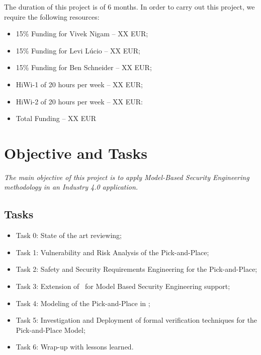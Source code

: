 The duration of this project is of 6 months. In order to carry out this project, we require the following resources:

\begin{itemize}
  \item 15\% Funding for Vivek Nigam -- XX EUR;
  \item 15\% Funding for Levi L\'ucio -- XX EUR;
  \item 15\% Funding for Ben Schneider -- XX EUR;
  \item HiWi-1 of 20 hours per week -- XX EUR;
  \item HiWi-2 of 20 hours per week -- XX EUR:
  \item Total Funding -- XX EUR
\end{itemize}

\section{Objective and Tasks}

\begin{center}
  \emph{The main objective of this project is to apply Model-Based Security Engineering methodology in an Industry 4.0 application.}
\end{center}

\subsection{Tasks}

\begin{itemize}
  \item Task 0: State of the art reviewing;
  \item Task 1: Vulnerability and Risk Analysis of the Pick-and-Place;  
  \item Task 2: Safety and Security Requirements Engineering for the Pick-and-Place; 
  \item Task 3: Extension of \autofocus\ for Model Based Security Engineering support;
  \item Task 4: Modeling of the Pick-and-Place in \autofocus;
  \item Task 5: Investigation and Deployment of formal verification techniques for the Pick-and-Place Model;
  \item Task 6: Wrap-up with lessons learned.
\end{itemize}


